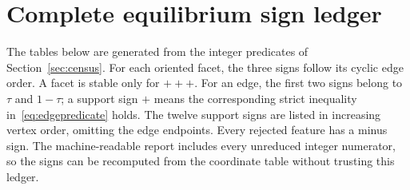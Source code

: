 \documentclass[11pt]{amsart}
\theoremstyle{remark}
\begin{document}
\appendix
\section{Complete equilibrium sign ledger}\label{app:ledger}
The tables below are generated from the integer predicates of Section~\ref{sec:census}. For each oriented facet, the three signs follow its cyclic edge order. A facet is stable only for $+++$. For an edge, the first two signs belong to $\tau$ and $1-\tau$; a support sign $+$ means the corresponding strict inequality in~\eqref{eq:edgepredicate} holds. The twelve support signs are listed in increasing vertex order, omitting the edge endpoints. Every rejected feature has a minus sign. The machine-readable report includes every unreduced integer numerator, so the signs can be recomputed from the coordinate table without trusting this ledger.

\end{document}
